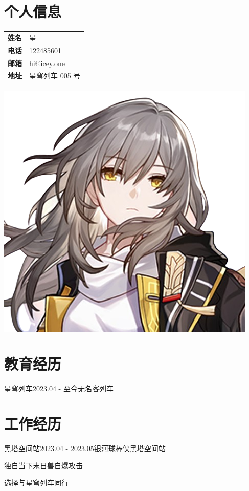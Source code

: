\documentclass{plain-cv} %
\begin{document}

\section{个人信息}
\begin{minipage}{0.75\textwidth}
        \begin{tabular}{ll}
        \textbf{姓名} & 星         \\
        \textbf{电话} & 122485601     \\
        \textbf{邮箱} & \href{mailto:hi@icey.one}{hi@icey.one} \\
        \textbf{地址} & 星穹列车 005 号 
        \end{tabular}
\end{minipage}
\hfill
\begin{minipage}{0.3\textwidth}
    \includegraphics[height=0.5\textwidth]{images/Stelle.png}
\end{minipage}

\section{教育经历}

\begin{cSubsection}
    {星穹列车}{2023.04 - 至今}{无名客}{列车}
\end{cSubsection}

\section{工作经历}

\begin{rSubsection}
    {黑塔空间站}{2023.04 - 2023.05}{银河球棒侠}{黑塔空间站}
    \item 独自当下末日兽自爆攻击
    \item 选择与星穹列车同行
\end{rSubsection}
\end{document}
